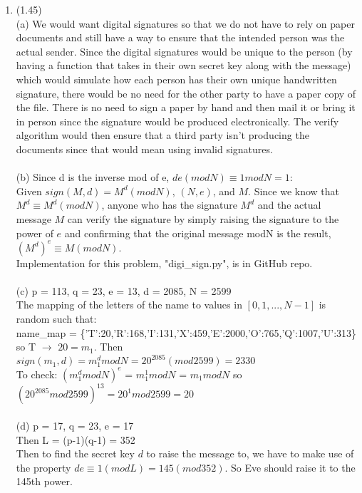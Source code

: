 \documentclass{article}
\begin{document}
\begin{enumerate}
		\item
			(1.45) 
			\\
			(a) We would want digital signatures so that we do not have to rely on paper documents and still have a way to ensure that the intended person was the actual sender. Since the digital signatures would be unique to the person (by having a function that takes in their own secret key along with the message) which would simulate how each person has their own unique handwritten signature, there would be no need for the other party to have a paper copy of the file. There is no need to sign a paper by hand and then mail it or bring it in person since the signature would be produced electronically. The verify algorithm would then ensure that a third party isn't producing the documents since that would mean using invalid signatures.
			\\ \\
			(b) Since d is the inverse mod of e, $de(mod N) \equiv 1 mod N = 1$: \\
        			Given $sign(M,d) = M^d(modN)$, $(N,e)$, and $M$. Since we know that $M^d \equiv M^d(modN)$, anyone who has the signature $M^d$ and the actual message $M$ can verify the signature by simply raising the signature to the power of $e$ and confirming that the original message modN is the result, $(M^{d})^{e} \equiv M(modN)$.
			\\
			Implementation for this problem, "digi\_sign.py", is in GitHub repo.
			\\
			\\
			(c) p = 113, q = 23, e = 13, d = 2085, N = 2599
			\\
			The mapping of the letters of the name to values in $[0,1,...,N-1]$ is random such that: \\
			name\_map = \{'T':20,'R':168,'I':131,'X':459,'E':2000,'O':765,'Q':1007,'U':313\} \\
			so T $\rightarrow$ $20 = m_1$. Then $sign(m_1,d) = m_1^dmodN = 20^{2085}(mod 2599) = 2330$ 	\\
			To check: $(m_1^dmodN)^e$ = $m_1^1modN$ = $m_1modN$ so $(20^{2085}mod2599)^{13} = 20^1mod2599 = 20$
			\\ \\
			(d) p = 17, q = 23, e = 17 \\
			Then L = (p-1)(q-1) = 352 \\
			Then to find the secret key $d$ to raise the message to, we have to make use of the property $de \equiv1(modL) = 145(mod352)$.
			So Eve should raise it to the 145th power.
			\\
			

\end{enumerate}
\end{document}
